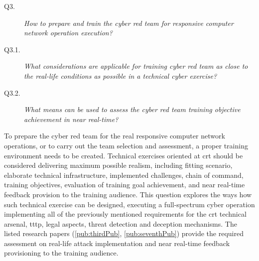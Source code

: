 \begin{description}
    \item [Q3.] \emph{How to prepare and train the cyber red team for responsive computer network operation execution?}
    \item [Q3.1.] \emph{What considerations are applicable for training cyber red team as close to the real-life conditions as possible in a technical cyber exercise?}
    \item [Q3.2.] \emph{What means can be used to assess the cyber red team training objective achievement in near real-time?}
\end{description}
To prepare the cyber red team for the real responsive computer network operations, or to carry out the team selection and assessment, a proper training environment needs to be created. Technical exercises oriented at \gls{crt} should be considered delivering maximum possible realism, including fitting scenario, elaborate technical infrastructure, implemented challenges, chain of command, training objectives, evaluation of training goal achievement, and near real-time feedback provision to the training audience.
This question explores the ways how such technical exercise can be designed, executing a full-spectrum cyber operation implementing all of the previously mentioned requirements for the \gls{crt} technical arsenal, \gls{tttp}, legal aspects, threat detection and deception mechanisms. The listed research papers (\ref{pub:thirdPub}, \ref{pub:seventhPub}) provide the required assessment on real-life attack implementation and near real-time feedback provisioning to the training audience.

